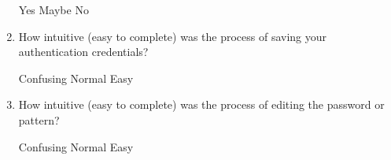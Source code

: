 \begin{enumerate}
Yes	\tab\tab	Maybe	\tab\tab 	No 
  
  \item How intuitive (easy to complete) was the process of saving your authentication credentials?
  
Confusing	\tab\tab	Normal	\tab\tab	Easy 
  
  \item How intuitive (easy to complete) was the process of editing the password or pattern?
  
Confusing	\tab\tab	Normal	\tab\tab	Easy
 
\end{enumerate}

